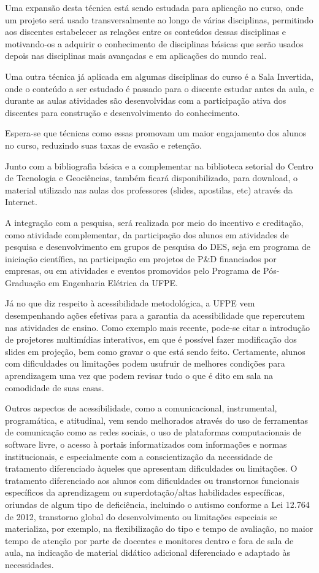 Uma expansão desta técnica está sendo estudada para aplicação no curso, onde um projeto será usado transversalmente ao longo de várias disciplinas, permitindo aos discentes estabelecer as relações entre os conteúdos dessas disciplinas e motivando-os a adquirir o conhecimento de disciplinas básicas que serão usados depois nas disciplinas mais avançadas e em aplicações do mundo real.

Uma outra técnica já aplicada em algumas disciplinas do curso é a Sala Invertida, onde o conteúdo a ser estudado é passado para o discente estudar antes da aula, e durante as aulas atividades são desenvolvidas com a participação ativa dos discentes para construção e desenvolvimento do conhecimento.

Espera-se que técnicas como essas promovam um maior engajamento dos alunos no curso, reduzindo suas taxas de evasão e retenção.

Junto com a bibliografia básica e a complementar na biblioteca setorial do Centro de Tecnologia e Geociências, também ficará disponibilizado, para download, o material utilizado nas aulas dos professores (slides, apostilas, etc) através da Internet. 

A integração com a pesquisa, será realizada por meio do incentivo e creditação, como atividade complementar, da participação dos alunos em atividades de pesquisa e desenvolvimento em grupos de pesquisa do DES, seja em programa de iniciação científica, na participação em projetos de P\&D financiados por empresas, ou em atividades e eventos promovidos pelo Programa de Pós-Graduação em Engenharia Elétrica da UFPE.

Já no que diz respeito à acessibilidade metodológica, a UFPE vem desempenhando ações efetivas para a garantia da acessibilidade que repercutem nas atividades de ensino. Como exemplo mais recente, pode-se citar a introdução de projetores multimídias interativos, em que é possível fazer modificação dos slides em projeção, bem como gravar o que está sendo feito. Certamente, alunos com dificuldades ou limitações podem usufruir de melhores condições para aprendizagem uma vez que podem revisar tudo o que é dito em sala na comodidade de suas casas.

Outros aspectos de acessibilidade, como a comunicacional, instrumental, programática, e atitudinal, vem sendo melhorados através do uso de ferramentas de comunicação como as redes sociais, o uso de plataformas computacionais de software livre, o acesso à portais informatizados com informações e normas institucionais, e especialmente com a conscientização da necessidade de tratamento diferenciado àqueles que apresentam dificuldades ou limitações. O tratamento diferenciado aos alunos com dificuldades ou transtornos funcionais específicos da aprendizagem ou superdotação/altas habilidades específicas, oriundas de algum tipo de deficiência, incluindo o autismo conforme a Lei 12.764 de 2012, transtorno global do desenvolvimento ou limitações especiais se materializa, por exemplo, na flexibilização do tipo e tempo de avaliação, no maior tempo de atenção por parte de docentes e monitores dentro e fora de sala de aula, na indicação de material didático adicional diferenciado e adaptado às necessidades.

